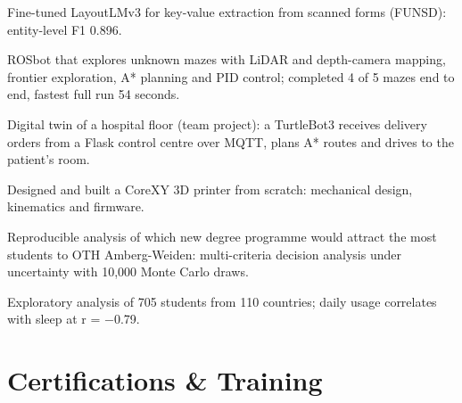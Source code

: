 \documentclass[a4paper,10pt]{article}
\begin{document}
  \cvpointsstart
    \item Fine-tuned LayoutLMv3 for key-value extraction from scanned forms (FUNSD): entity-level F1 0.896.
  \cvpointsend


  \cvpointsstart
    \item ROSbot that explores unknown mazes with LiDAR and depth-camera mapping, frontier exploration, A* planning
          and PID control; completed 4 of 5 mazes end to end, fastest full run 54 seconds.
  \cvpointsend

  \cvpointsstart
    \item Digital twin of a hospital floor (team project): a TurtleBot3 receives delivery orders from a Flask control
          centre over MQTT, plans A* routes and drives to the patient's room.
  \cvpointsend

  \cvpointsstart
    \item Designed and built a CoreXY 3D printer from scratch: mechanical design, kinematics and firmware.
  \cvpointsend


  \cvpointsstart
    \item Reproducible analysis of which new degree programme would attract the most students to OTH Amberg-Weiden:
          multi-criteria decision analysis under uncertainty with 10,000 Monte Carlo draws.
  \cvpointsend

  \cvpointsstart
    \item Exploratory analysis of 705 students from 110 countries; daily usage correlates with sleep at r = $-$0.79.
  \cvpointsend

\cvlistend

\section{Certifications \& Training}
\cvliststart
\cvlistend
\end{document}
